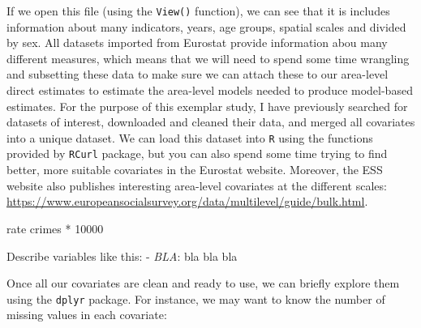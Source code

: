 \documentclass[
]{article}
\newenvironment{Shaded}{\begin{snugshade}}{\end{snugshade}}
\newcommand{\CommentTok}[1]{\textcolor[rgb]{0.56,0.35,0.01}{\textit{#1}}}
\newcommand{\DataTypeTok}[1]{\textcolor[rgb]{0.13,0.29,0.53}{#1}}
\newcommand{\DecValTok}[1]{\textcolor[rgb]{0.00,0.00,0.81}{#1}}
\newcommand{\KeywordTok}[1]{\textcolor[rgb]{0.13,0.29,0.53}{\textbf{#1}}}
\newcommand{\NormalTok}[1]{#1}
\newcommand{\OperatorTok}[1]{\textcolor[rgb]{0.81,0.36,0.00}{\textbf{#1}}}
\newcommand{\StringTok}[1]{\textcolor[rgb]{0.31,0.60,0.02}{#1}}
\begin{document}
If we open this file (using the \texttt{View()} function), we can see
that it is includes information about many indicators, years, age
groups, spatial scales and divided by sex. All datasets imported from
Eurostat provide information abou many different measures, which means
that we will need to spend some time wrangling and subsetting these data
to make sure we can attach these to our area-level direct estimates to
estimate the area-level models needed to produce model-based estimates.
For the purpose of this exemplar study, I have previously searched for
datasets of interest, downloaded and cleaned their data, and merged all
covariates into a unique dataset. We can load this dataset into
\texttt{R} using the functions provided by \texttt{RCurl} package, but
you can also spend some time trying to find better, more suitable
covariates in the Eurostat website. Moreover, the ESS website also
publishes interesting area-level covariates at the different scales:
\url{https://www.europeansocialsurvey.org/data/multilevel/guide/bulk.html}.

\begin{Shaded}
\end{Shaded}

rate crimes * 10000

Describe variables like this: - \emph{BLA}: bla bla bla

Once all our covariates are clean and ready to use, we can briefly
explore them using the \texttt{dplyr} package. For instance, we may want
to know the number of missing values in each covariate:

\begin{Shaded}
\end{Shaded}
\end{document}
